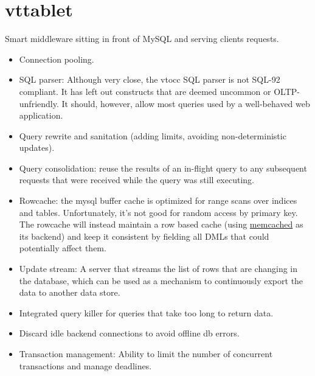 \section{vttablet}\hypertarget{vttablet}{}\label{vttablet}

Smart middleware sitting in front of MySQL and serving clients
requests.

\begin{itemize}
\item Connection pooling.
\item SQL parser: Although very close, the vtocc SQL parser is not SQL-92
compliant. It has left out constructs that are deemed uncommon or
OLTP-unfriendly. It should, however, allow most queries used by a
well-behaved web application.
\item Query rewrite and sanitation (adding limits, avoiding non-deterministic updates).
\item Query consolidation: reuse the results of an in-flight query to any
subsequent requests that were received while the query was still
executing.
\item Rowcache: the mysql buffer cache is optimized for range scans over
indices and tables. Unfortunately, it’s not good for random access
by primary key. The rowcache will instead maintain a row based cache
(using \href{http://memcached.org/}{memcached} as its backend) and keep it
consistent by fielding all DMLs that could potentially affect them.
\item Update stream: A server that streams the list of rows that are changing
in the database, which can be used as a mechanism to continuously export
the data to another data store.
\item Integrated query killer for queries that take too long to return
data.
\item Discard idle backend connections to avoid offline db errors.
\item Transaction management: Ability to limit the number of concurrent
transactions and manage deadlines.
\end{itemize}
